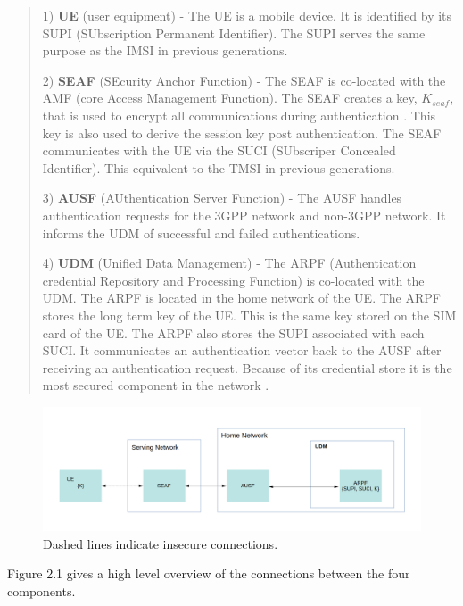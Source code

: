 \documentclass[11pt, pdftex]{article}
\begin{document}
\begin{quote}
1) \textbf{UE} (user equipment) -  The UE is a mobile device.  It is identified by its SUPI (SUbscription Permanent   
Identifier).  The SUPI serves the same purpose as the IMSI in previous generations.

2) \textbf{SEAF} (SEcurity Anchor Function) - The SEAF is co-located with the AMF (core Access Management Function).  The SEAF creates a key, $K_{seaf}$, that is used to encrypt all communications during authentication  \cite{zhang2017overview}.  This key is also used to derive the session key post authentication.  The SEAF communicates with the UE via the SUCI (SUbscriper Concealed Identifier).  This equivalent to the TMSI in previous generations. 

3) \textbf{AUSF} (AUthentication Server Function) -  The AUSF handles authentication requests for the 3GPP network and non-3GPP network.  It informs the UDM of successful and failed authentications.  

4) \textbf{UDM} (Unified Data Management) - The ARPF (Authentication credential Repository and Processing Function) is co-located with the UDM. The ARPF is located in the home network of the UE. The ARPF stores the long term key of the UE.  This is the same key stored on the SIM card of the UE.  The ARPF also stores the SUPI associated with each SUCI.  It communicates an authentication vector back to the AUSF after receiving an authentication request.  Because of its credential store it is the most secured component in the network \cite{cremers2017comprehensive}.

\end{quote}

\graphicspath{ {./images/} }
\begin{figure}[h]
	\begin{center}
		\includegraphics[scale=0.21]{Figure2_1.png}
	\end{center}
	\caption{Dashed lines indicate insecure connections.}
\end{figure}

Figure 2.1 gives a high level overview of the connections between the four components.
\end{document}
